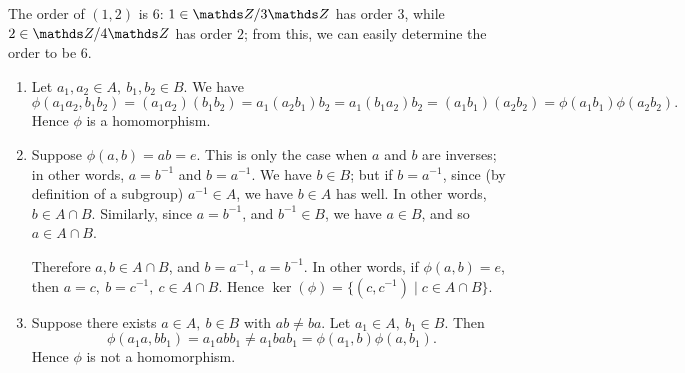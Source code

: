 \documentclass{homework}
\begin{document}
\begin{solution}
  The order of $(1,2)$ is $6$: $1\in \Z / 3\Z$ has order $3$, while $2\in \Z / 4\Z$ has order $2$;
  from this, we can easily determine the order to be $6$.

  \begin{enumerate}[label=(\alph*)]
    \item Let $a_1,a_2\in A,\ b_1,b_2\in B $. We have \[
        \phi(a_1a_2,b_1b_2) =
        (a_1a_2)(b_1b_2)=a_1(a_2b_1)b_2=a_1(b_1a_2)b_2=(a_1b_1)(a_2b_2)=\phi(a_1b_1)\phi(a_2b_2)
      .\] Hence $\phi$ is a homomorphism.
    \item Suppose $\phi(a,b)=ab=e$. This is only the case when $a$ and $b$ are inverses; in other
      words, $a=b^{-1}$ and $b=a^{-1}$. We have $b\in B$; but if $b=a^{-1}$, since (by definition of a
      subgroup) $a^{-1}\in A$, we have $b\in A$ has well. In other words, $b\in A\cap B$. Similarly,
      since $a=b^{-1}$, and $b^{-1}\in B$, we have $a\in B$, and so $a\in A\cap B$.

      Therefore $a,b\in A\cap B$, and $b=a^{-1}$, $a=b^{-1}$. In other words, if $\phi(a,b)=e$,
      then $a=c,\ b=c^{-1},\ c\in A\cap B$. Hence $\ker(\phi)=\{ (c,c^{-1})\mid c\in A\cap B \}$.
    \item Suppose there exists $a\in A,\ b\in B$ with $ab\neq ba$. Let $a_1\in A,\ b_1\in
      B$. Then \[
        \phi(a_1a,bb_1)=a_1abb_1\neq a_1bab_1=\phi(a_1,b)\phi(a,b_1)
      .\] Hence $\phi$ is not a homomorphism.
  \end{enumerate}
\end{solution}
\end{document}
